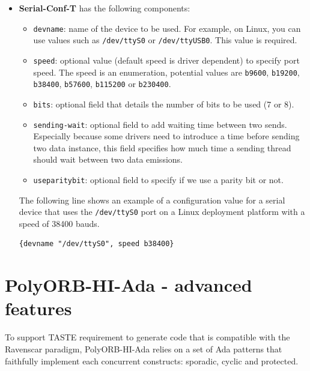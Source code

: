 \documentclass[11pt]{book}
\newcommand{\Concept}[1]{#1\xspace}
\newcommand{\taste}{\Concept{TASTE}}
\begin{document}
\begin{itemize}
      \item
         \textbf{Serial-Conf-T} has the following components:
         \begin{itemize}
            \item
               \texttt{devname}: name of the device to be used. For example, on
               Linux, you can use values such as \texttt{/dev/ttyS0} or
               \texttt{/dev/ttyUSB0}. This value is required.
            \item
               \texttt{speed}: optional value (default speed is driver
               dependent) to specify port speed. The speed is an enumeration,
               potential values are \texttt{b9600}, \texttt{b19200}, 
               \texttt{b38400}, \texttt{b57600}, \texttt{b115200} or \texttt{b230400}.
            \item
               \texttt{bits}: optional field that details the number of bits to be used (7 or 8).
            \item
               \texttt{sending-wait}: optional field to add waiting time between
               two sends. Especially because some drivers need to introduce a
               time before sending two data instance, this field specifies how
               much time a sending thread should wait between two data
               emissions.
            \item
               \texttt{useparitybit}: optional field to specify if we use a
               parity bit or not.
         \end{itemize}

         The following line shows an example of a configuration value for a
         serial device that uses the \texttt{/dev/ttyS0} port on a Linux
         deployment platform with a speed of 38400 bauds.

         \begin{lstlisting}[frame=single]
         {devname "/dev/ttyS0", speed b38400}
         \end{lstlisting}


   \end{itemize}

\section{PolyORB-HI-Ada - advanced features}
To support \taste requirement to generate code that is compatible with the 
Ravenscar paradigm, PolyORB-HI-Ada
relies on a set of Ada patterns that faithfully implement each
concurrent constructs: sporadic, cyclic and protected.
\end{document}
